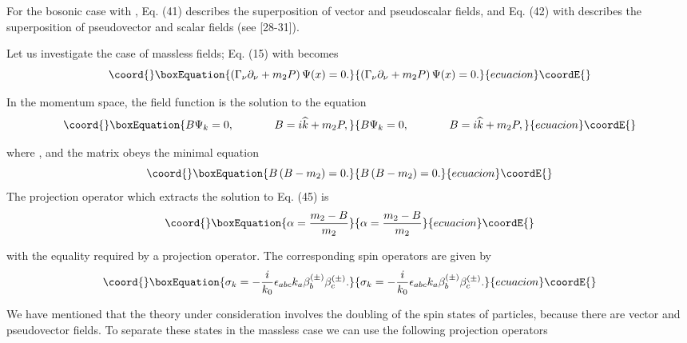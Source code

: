 \documentclass[a4paper,12pt]{article}
\begin{document}
For the bosonic case with \myHighlight{$\varepsilon =\overline{\varepsilon }$}\coordHE{}, Eq. (41)
describes the superposition of vector and pseudoscalar fields, and Eq. (42)
with \myHighlight{$\varepsilon =-\overline{\varepsilon }$}\coordHE{} describes the superposition of
pseudovector and scalar fields (see [28-31]).

Let us investigate the case of massless fields; Eq. (15) with \coordHE{}
becomes
\begin{equation}\coord{}\boxEquation{
\left( \Gamma _\nu \partial _\nu +m_2P\right) \Psi (x)=0
.\label{44}
}{
\left( \Gamma _\nu \partial _\nu +m_2P\right) \Psi (x)=0
.}{ecuacion}\coordE{}\end{equation}

In the momentum space, the field function \coordHE{} is the solution to the
equation
\begin{equation}\coord{}\boxEquation{
B\Psi _k=0 ,\hspace{0.5in}B=i\widehat{k}+m_2P , \label{45}
}{
B\Psi _k=0 ,\hspace{0.5in}B=i\widehat{k}+m_2P , }{ecuacion}\coordE{}\end{equation}

where \coordHE{}, \coordHE{} and the matrix \coordHE{}
obeys the minimal equation
\begin{equation}\coord{}\boxEquation{
B\left( B-m_2\right) =0 . \label{46}
}{
B\left( B-m_2\right) =0 . }{ecuacion}\coordE{}\end{equation}
The projection operator which extracts the solution to Eq. (45) is
\begin{equation}\coord{}\boxEquation{
\alpha =\frac{m_2-B}{m_2}  \label{47}
}{
\alpha =\frac{m_2-B}{m_2}  }{ecuacion}\coordE{}\end{equation}

with the equality \coordHE{} required by a projection operator. The
corresponding spin operators are given by
\begin{equation}\coord{}\boxEquation{
\sigma _k=-\frac i{k_0}\epsilon _{abc}k_a\beta _b^{(\pm )}\beta
_c^{(\pm )} .\label{48}
}{
\sigma _k=-\frac i{k_0}\epsilon _{abc}k_a\beta _b^{(\pm )}\beta
_c^{(\pm )} .}{ecuacion}\coordE{}\end{equation}

We have mentioned that the theory under consideration involves the
doubling of the spin states of particles, because there are vector
and pseudovector fields. To separate these states in the massless
case we can use the following projection operators
\end{document}
